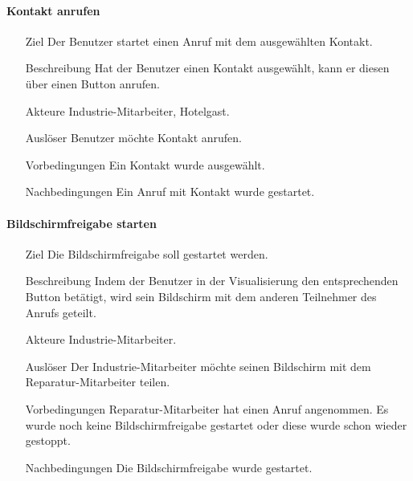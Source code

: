 \paragraph{Kontakt anrufen}
    \begin{itemize}
        \item[Ziel]
        Der Benutzer startet einen Anruf mit dem ausgewählten Kontakt.
        \item[Beschreibung]
        Hat der Benutzer einen Kontakt ausgewählt, kann er diesen über einen Button anrufen.
        \item[Akteure]
        Industrie-Mitarbeiter, Hotelgast.
        \item[Auslöser]
        Benutzer möchte Kontakt anrufen.
        \item[Vorbedingungen]
        Ein Kontakt wurde ausgewählt.
        \item[Nachbedingungen]
        Ein Anruf mit Kontakt wurde gestartet.
        \end{itemize}

\paragraph{Bildschirmfreigabe starten}
    \begin{itemize}
        \item[Ziel]
        Die Bildschirmfreigabe soll gestartet werden.
        \item[Beschreibung]
        Indem der Benutzer in der Visualisierung den entsprechenden Button betätigt, wird sein Bildschirm mit dem anderen Teilnehmer des Anrufs geteilt.
        \item[Akteure]
        Industrie-Mitarbeiter.
        \item[Auslöser]
        Der Industrie-Mitarbeiter möchte seinen Bildschirm mit dem Reparatur-Mitarbeiter teilen.
        \item[Vorbedingungen]
        Reparatur-Mitarbeiter hat einen Anruf angenommen.
        Es wurde noch keine Bildschirmfreigabe gestartet oder diese wurde schon wieder gestoppt.
        \item[Nachbedingungen]
        Die Bildschirmfreigabe wurde gestartet.
        \end{itemize}

